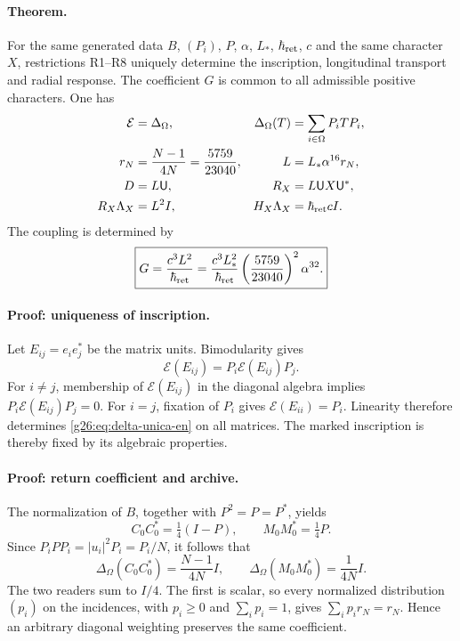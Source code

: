 \paragraph{Theorem.}
For the same generated data \(B\), \((P_i)\), \(P\),
\(\alpha\), \(L_*\), \(\hbar_{\rm ret}\), \(c\) and the same
character \(X\), restrictions R1--R8 uniquely determine the
inscription, longitudinal transport and radial response. The coefficient
\(G\) is common to all admissible positive characters. One has
\begin{align}
 \mathcal E&=\Delta_\Omega,
 &\Delta_\Omega(T)&=\sum_{i\in\Omega}P_iTP_i,\label{g26:eq:delta-unica-en}\\
 r_N&=\frac{N-1}{4N}=\frac{5759}{23040},
 &L&=L_*\alpha^{16}r_N,\label{g26:eq:longitud-unica-en}\\
 D&=L\mathsf U,
 &R_X&=L\mathsf U X\mathsf U^*,\label{g26:eq:radial-unica-en}\\
 R_X\Lambda_X&=L^2I,
 &H_X\Lambda_X&=\hbar_{\rm ret}cI.\label{g26:eq:productos-radiales-en}
\end{align}
The coupling is determined by
\begin{equation}
 \boxed{G=\frac{c^3L^2}{\hbar_{\rm ret}}
 =\frac{c^3L_*^2}{\hbar_{\rm ret}}
   \left(\frac{5759}{23040}\right)^2\alpha^{32}.}
 \label{g26:eq:g-rigido-en}
\end{equation}

\paragraph{Proof: uniqueness of inscription.}
Let \(E_{ij}=e_ie_j^*\) be the matrix units. Bimodularity gives
\[
 \mathcal E(E_{ij})=P_i\mathcal E(E_{ij})P_j.
\]
For \(i\ne j\), membership of \(\mathcal E(E_{ij})\) in the
diagonal algebra implies \(P_i\mathcal E(E_{ij})P_j=0\).
For \(i=j\), fixation of \(P_i\) gives
\(\mathcal E(E_{ii})=P_i\). Linearity therefore determines
\eqref{g26:eq:delta-unica-en} on all matrices. The marked inscription
is thereby fixed by its algebraic properties.

\paragraph{Proof: return coefficient and archive.}
The normalization of \(B\), together with \(P^2=P=P^*\), yields
\[
 C_0C_0^*=\tfrac14(I-P),\qquad M_0M_0^*=\tfrac14P.
\]
Since \(P_iPP_i=|u_i|^2P_i=P_i/N\), it follows that
\begin{equation}
 \Delta_\Omega(C_0C_0^*)=\frac{N-1}{4N}I,
 \qquad
 \Delta_\Omega(M_0M_0^*)=\frac{1}{4N}I.
 \label{g26:eq:retorno-y-memoria-en}
\end{equation}
The two readers sum to \(I/4\). The first is scalar, so every
normalized distribution \((p_i)\) on the incidences, with
\(p_i\geq0\) and \(\sum_i p_i=1\), gives
\(\sum_i p_i r_N=r_N\). Hence an arbitrary diagonal weighting
preserves the same coefficient.

